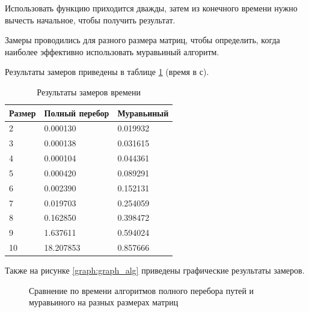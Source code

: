 Использовать функцию приходится дважды, затем из конечного времени нужно вычесть начальное, чтобы получить результат.

Замеры проводились для разного размера матриц, чтобы определить, когда наиболее эффективно использовать муравьиный алгоритм.

Результаты замеров приведены в таблице \ref{tbl:time_mes} (время в с).


\begin{center}
	\captionsetup{justification=raggedright,singlelinecheck=off}
	\begin{longtable}[c]{|p{4cm}|p{4cm}|p{4cm}|}
		\caption{Результаты замеров времени\label{tbl:time_mes}}\\ \hline
		Размер & Полный перебор & Муравьиный \\ \hline
		2 &   0.000130 &   0.019932 \\ \hline
		3 &   0.000138 &   0.031615 \\ \hline
		4 &   0.000104 &   0.044361 \\ \hline
		5 &   0.000420 &   0.089291 \\ \hline
		6 &   0.002390 &   0.152131 \\ \hline
		7 &   0.019703 &   0.254059 \\ \hline
		8 &   0.162850 &   0.398472 \\ \hline
		9 &   1.637611 &   0.594024 \\ \hline
		10 &  18.207853 &   0.857666 \\ \hline
	\end{longtable}
\end{center}

\clearpage

Также на рисунке \ref{graph:graph_alg} приведены графические результаты замеров.

\begin{figure}[ht!]
	\centering
	
	\caption{Сравнение по времени алгоритмов полного перебора путей и муравьиного на разных размерах матриц\label{graph:graph_alg}}
	\label{fig:plotting_data1}
	\end{figure}


				
